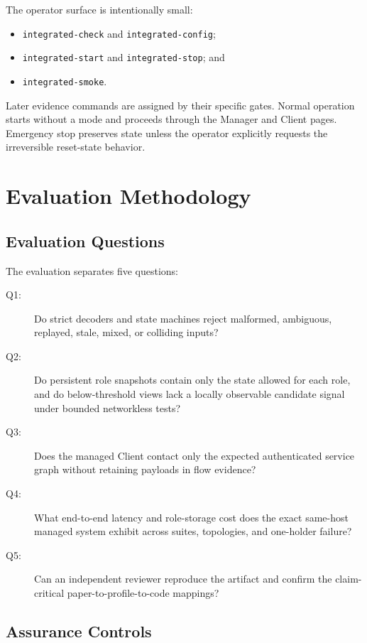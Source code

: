 \documentclass[sigconf,anonymous]{acmart}
\begin{document}
The operator surface is intentionally small:
\begin{itemize}
  \item \texttt{integrated-check} and \texttt{integrated-config};
  \item \texttt{integrated-start} and \texttt{integrated-stop}; and
  \item \texttt{integrated-smoke}.
\end{itemize}
Later evidence commands are assigned by their specific gates. Normal operation
starts without a mode and proceeds through the Manager and Client pages.
Emergency stop preserves state unless the operator explicitly requests the
irreversible reset-state behavior.

\section{Evaluation Methodology}
\label{sec:evaluation}

\subsection{Evaluation Questions}

The evaluation separates five questions:
\begin{description}
  \item[Q1:] Do strict decoders and state machines reject malformed,
  ambiguous, replayed, stale, mixed, or colliding inputs?
  \item[Q2:] Do persistent role snapshots contain only the state allowed for
  each role, and do below-threshold views lack a locally observable candidate
  signal under bounded networkless tests?
  \item[Q3:] Does the managed Client contact only the expected authenticated
  service graph without retaining payloads in flow evidence?
  \item[Q4:] What end-to-end latency and role-storage cost does the exact
  same-host managed system exhibit across suites, topologies, and one-holder
  failure?
  \item[Q5:] Can an independent reviewer reproduce the artifact and confirm
  the claim-critical paper-to-profile-to-code mappings?
\end{description}

\subsection{Assurance Controls}
\end{document}
